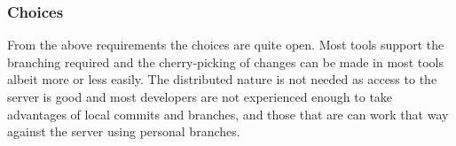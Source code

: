 \documentclass[a4paper,11pt]{article}
\begin{document}
\subsubsection{Choices}
From the above requirements the choices are quite open. Most tools support the
branching required and the cherry-picking of changes can be made in most tools
albeit more or less easily. The distributed nature is not needed as access to
the server is good and most developers are not experienced enough to take
advantages of local commits and branches, and those that are can work that way
against the server using personal branches.





\end{document}
